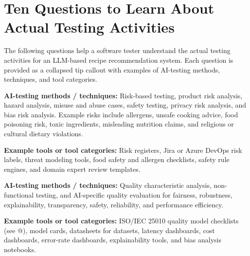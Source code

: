 \documentclass[
  letterpaper,
  DIV=11,
  numbers=noendperiod,
  oneside]{scrreprt}
\begin{document}

\chapter{Ten Questions to Learn About Actual Testing
Activities}\label{ten-questions-to-learn-about-actual-testing-activities}

The following questions help a software tester understand the actual
testing activities for an LLM-based recipe recommendation system. Each
question is provided as a collapsed tip callout with examples of
AI-testing methods, techniques, and tool categories.

\begin{tcolorbox}[enhanced jigsaw, arc=.35mm, bottomrule=.15mm, bottomtitle=1mm, breakable, colback=white, colbacktitle=quarto-callout-tip-color!10!white, colframe=quarto-callout-tip-color-frame, coltitle=black, left=2mm, leftrule=.75mm, opacityback=0, opacitybacktitle=0.6, rightrule=.15mm, title=\textcolor{quarto-callout-tip-color}{\faLightbulb}\hspace{0.5em}{What are the main product risks for recipe recommendations?}, titlerule=0mm, toprule=.15mm, toptitle=1mm]

\textbf{AI-testing methods / techniques:} Risk-based testing, product
risk analysis, hazard analysis, misuse and abuse cases, safety testing,
privacy risk analysis, and bias risk analysis. Example risks include
allergens, unsafe cooking advice, food poisoning risk, toxic
ingredients, misleading nutrition claims, and religious or cultural
dietary violations.

\textbf{Example tools or tool categories:} Risk registers, Jira or Azure
DevOps risk labels, threat modeling tools, food safety and allergen
checklists, safety rule engines, and domain expert review templates.

\end{tcolorbox}

\begin{tcolorbox}[enhanced jigsaw, arc=.35mm, bottomrule=.15mm, bottomtitle=1mm, breakable, colback=white, colbacktitle=quarto-callout-tip-color!10!white, colframe=quarto-callout-tip-color-frame, coltitle=black, left=2mm, leftrule=.75mm, opacityback=0, opacitybacktitle=0.6, rightrule=.15mm, title=\textcolor{quarto-callout-tip-color}{\faLightbulb}\hspace{0.5em}{Which quality characteristics are most important for this system?}, titlerule=0mm, toprule=.15mm, toptitle=1mm]

\textbf{AI-testing methods / techniques:} Quality characteristic
analysis, non-functional testing, and AI-specific quality evaluation for
fairness, robustness, explainability, transparency, safety, reliability,
and performance efficiency.

\textbf{Example tools or tool categories:} ISO/IEC 25010 quality model
checklists (see @), model cards, datasheets for datasets, latency
dashboards, cost dashboards, error-rate dashboards, explainability
tools, and bias analysis notebooks.

\end{tcolorbox}
\end{document}
